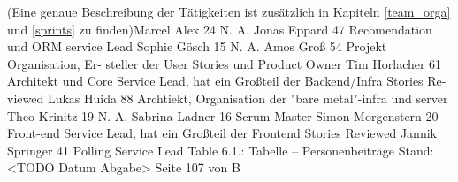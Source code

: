 \begin{table}[h]
\caption{Tabelle – Personenbeiträge} \label{tab:person_beitrag}
\end{table}
(Eine genaue Beschreibung der Tätigkeiten ist zusätzlich in Kapiteln \ref{team_orga} und \ref{sprints} zu finden)Marcel Alex 24 N. A.
Jonas Eppard 47 Recomendation und ORM
service Lead
Sophie Gösch 15 N. A.
Amos Groß 54 Projekt Organisation, Er-
steller der User Stories und
Product Owner
Tim Horlacher 61 Architekt und Core Service
Lead, hat ein Großteil der
Backend/Infra Stories Re-
viewed
Lukas Huida 88 Archtiekt, Organisation der
"bare metal"-infra und server
Theo Krinitz 19 N. A.
Sabrina Ladner 16 Scrum Master
Simon Morgenstern 20 Front-end Service Lead, hat
ein Großteil der Frontend
Stories Reviewed
Jannik Springer 41 Polling Service Lead
Table 6.1.: Tabelle – Personenbeiträge
Stand: <TODO Datum Abgabe> Seite 107 von B
